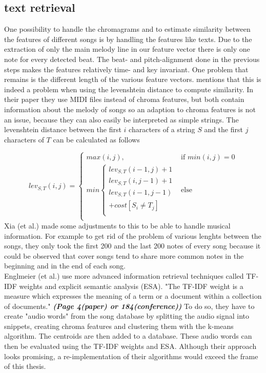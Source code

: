 \subsection{text retrieval}

One possibility to handle the chromagrams and to estimate similarity between the features of different songs is by handling the features like texts. Due to the extraction of only the main melody line in our feature vector there is only one note for every detected beat. The beat- and pitch-alignment done in the previous steps makes the features relatively time- and key invariant. One problem that remains is the different length of the various feature vectors. \cite{chroma4} mentions that this is indeed a problem when using the levenshtein distance to compute similarity. In their paper they use MIDI files instead of chroma features, but both contain information about the melody of songs so an adaption to chroma features is not an issue, because they can also easily be interpreted as simple strings. The levenshtein distance between the first $i$ characters of a string $S$ and the first $j$ characters of $T$ can be calculated as follows \cite[p. 7]{chroma4}

\begin{equation} \label{eq:tr1}
lev_{S,T}(i, j) = \begin{cases}
max(i, j), &\text{if } min(i, j) = 0\\
min \begin{cases}
lev_{S,T}(i-1, j) + 1\\
lev_{S,T}(i, j-1) + 1\\
lev_{S,T}(i-1, j-1)\\
+cost[S_i \neq T_j]\\
\end{cases} &\text{else} \\
\end{cases}
\end{equation}
Xia (et al.) made some adjustments to this to be able to handle musical information.\cite[pp. 7ff]{chroma4} For example to get rid of the problem of various lenghts between the songs, they only took the first 200 and the last 200 notes of every song because it could be observed that cover songs tend to share more common notes in the beginning and in the end of each song.
\ \\
Englmeier  (et al.) use more advanced information retrieval techniques called TF-IDF weights and explicit semantic analysis (ESA). "The TF-IDF weight is a measure which expresses the meaning of a term or a document within a collection of documents." \cite[p.4]{chroma1}
\textit{\textbf{(Page 4(paper) or 184(conference))}}
To do so, they have to create "audio words" from the song database by splitting the audio signal into snippets, creating chroma features and clustering them with the k-means algorithm. The centroids are then added to a database. These audio words can then be evaluated using the TF-IDF weights and ESA.
Although their approach looks promising, a re-implementation of their algorithms would exceed the frame of this thesis.

